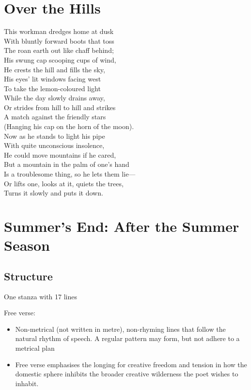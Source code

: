 \section{Over the Hills} \label{6/11/2024}
	This workman dredges home at dusk \\
	With bluntly forward boots that toss \\
	The roan earth out like chaff behind; \\
	His swung cap scooping cups of wind, \\
	He crests the hill and fills the sky, \\
	His eyes' lit windows facing west \\
	To take the lemon-coloured light \\
	While the day slowly drains away, \\
	Or strides from hill to hill and strikes \\
	A match against the friendly stars \\
	(Hanging his cap on the horn of the moon). \\
	Now as he stands to light his pipe \\
	With quite unconscious insolence, \\
	He could move mountains if he cared, \\
	But a mountain in the palm of one's hand \\
	Is a troublesome thing, so he lets them lie— \\
	Or lifts one, looks at it, quiets the trees, \\
	Turns it slowly and puts it down.

\section{Summer's End: After the Summer Season} \label{13/11/2024}
	\subsection{Structure}
		One stanza with 17 lines

		Free verse:
		\begin{itemize}
			\item Non-metrical (not written in metre), non-rhyming lines that follow the natural rhythm of speech. A regular pattern may form, but not adhere to a metrical plan
			\item Free verse emphasises the longing for creative freedom and tension in how the domestic sphere inhibits the broader creative wilderness the poet wishes to inhabit.
		\end{itemize}


